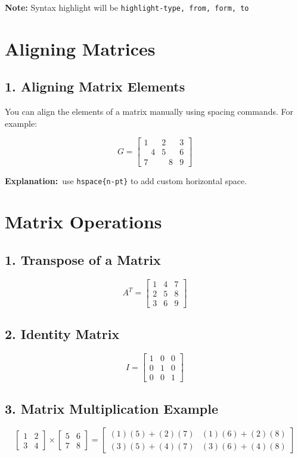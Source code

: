 \documentclass{article}
\begin{document}
\textbf{Note:} Syntax highlight will be \texttt{highlight-type, from, form, to}\

\section{Aligning Matrices}

\subsection{1. Aligning Matrix Elements}
You can align the elements of a matrix manually using spacing commands. For example:

\[
G = \begin{bmatrix}
1 & 2 & 3 \\
\hspace{10pt} 4 & 5 & 6 \\
7 & \hspace{10pt} 8 & 9
\end{bmatrix}
\]

\textbf{Explanation:}\ use \texttt{hspace\{n-pt\}} to add custom horizontal space.\

\section{Matrix Operations}

\subsection{1. Transpose of a Matrix}

\[
A^T = \begin{bmatrix}
1 & 4 & 7 \\
2 & 5 & 8 \\
3 & 6 & 9
\end{bmatrix}
\]

\subsection{2. Identity Matrix}
\[
I = \begin{bmatrix}
1 & 0 & 0 \\
0 & 1 & 0 \\
0 & 0 & 1
\end{bmatrix}
\]

\subsection{3. Matrix Multiplication Example}
\[
\begin{bmatrix}
1 & 2 \\
3 & 4
\end{bmatrix}
\times
\begin{bmatrix}
5 & 6 \\
7 & 8
\end{bmatrix}
= \begin{bmatrix}
(1)(5) + (2)(7) & (1)(6) + (2)(8) \\
(3)(5) + (4)(7) & (3)(6) + (4)(8)
\end{bmatrix}
\]
\end{document}
